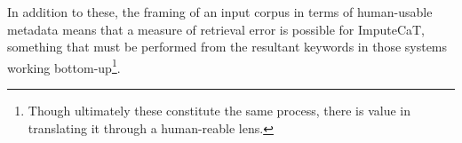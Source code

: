 In addition to these, the framing of an input corpus in terms of human-usable metadata means that a measure of retrieval error is possible for ImputeCaT, something that must be performed from the resultant keywords in those systems working bottom-up\footnote{Though ultimately these constitute the same process, there is value in translating it through a human-reable lens.}.



